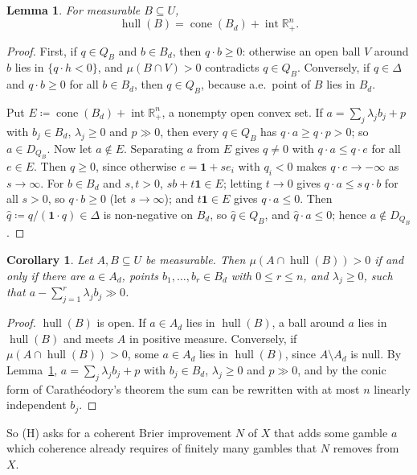\documentclass[11pt]{article}
\newcommand{\R}{\mathbb{R}}
\newcommand{\one}{\mathbf{1}}
\newcommand{\hull}{\operatorname{hull}}
\newcommand{\Rpp}{\inter\R^n_{+}}
\DeclareMathOperator{\cone}{cone}
\DeclareMathOperator{\inter}{int}
\theoremstyle{plain}
\newtheorem{lemma}[theorem]{Lemma}
\newtheorem{corollary}[theorem]{Corollary}
\theoremstyle{definition}
\theoremstyle{remark}
\begin{document}
\begin{lemma}\label{lem:hullformula}
For measurable $B\subseteq U$,
\[
  \hull(B)=\cone(B_d)+\Rpp .
\]
\end{lemma}

\begin{proof}
First, if $q\in Q_B$ and $b\in B_d$, then $q\cdot b\ge0$: otherwise an open ball $V$
around $b$ lies in $\{q\cdot h<0\}$, and $\mu(B\cap V)>0$ contradicts $q\in Q_B$.
Conversely, if $q\in\Delta$ and $q\cdot b\ge0$ for all $b\in B_d$, then $q\in Q_B$,
because a.e.\ point of $B$ lies in $B_d$.

Put $E\coloneqq\cone(B_d)+\Rpp$, a nonempty open convex set. If $a=\sum_j\lambda_jb_j+p$
with $b_j\in B_d$, $\lambda_j\ge0$ and $p\gg0$, then every $q\in Q_B$ has $q\cdot a\ge
q\cdot p>0$; so $a\in D_{Q_B}$. Now let $a\notin E$. Separating $a$ from $E$ gives
$q\ne0$ with $q\cdot a\le q\cdot e$ for all $e\in E$. Then $q\ge0$, since otherwise
$e=\one+se_i$ with $q_i<0$ makes $q\cdot e\to-\infty$ as $s\to\infty$. For $b\in B_d$
and $s,t>0$, $sb+t\one\in E$; letting $t\to0$ gives $q\cdot a\le s\,q\cdot b$ for all
$s>0$, so $q\cdot b\ge0$ (let $s\to\infty$); and $t\one\in E$ gives $q\cdot a\le0$. Then $\hat q\coloneqq
q/(\one\cdot q)\in\Delta$ is non-negative on $B_d$, so $\hat q\in Q_B$, and $\hat q\cdot
a\le0$; hence $a\notin D_{Q_B}$.
\end{proof}

\begin{corollary}\label{cor:witness}
Let $A,B\subseteq U$ be measurable. Then $\mu(A\cap\hull(B))>0$ if and only if there are
$a\in A_d$, points $b_1,\dots,b_r\in B_d$ with $0\le r\le n$, and $\lambda_j\ge0$, such
that $a-\sum_{j=1}^r\lambda_jb_j\gg0$.
\end{corollary}

\begin{proof}
$\hull(B)$ is open. If $a\in A_d$ lies in $\hull(B)$, a ball around $a$ lies in
$\hull(B)$ and meets $A$ in positive measure. Conversely, if $\mu(A\cap\hull(B))>0$,
some $a\in A_d$ lies in $\hull(B)$, since $A\setminus A_d$ is null. By
Lemma~\ref{lem:hullformula}, $a=\sum_j\lambda_jb_j+p$ with $b_j\in B_d$, $\lambda_j\ge0$
and $p\gg0$, and by the conic form of Carath\'eodory's theorem the sum can be rewritten
with at most $n$ linearly independent $b_j$.
\end{proof}

So (H) asks for a coherent Brier improvement $N$ of $X$ that adds some gamble $a$ which
coherence already requires of finitely many gambles that $N$ removes from $X$.
\end{document}
